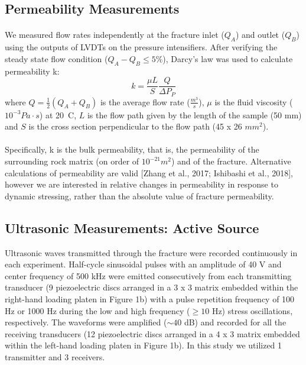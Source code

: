 \documentclass[letterpaper,10pt]{article}
\begin{document}
\subsection{Permeability Measurements}
\paragraph{} We measured flow rates independently at the fracture inlet ($Q_A$) and outlet ($Q_B$) using the outputs of LVDTs on the pressure intensifiers. After verifying the steady state flow condition ($Q_{A} - Q_{B}  \leq 5 \% $), Darcy’s law was
used to calculate permeability k:
\begin{equation} \label{eq:perm}
	k = \frac{\mu L}{S} \frac{Q}{\Delta P_P}
\end{equation}
where $Q = \frac{1}{2} (Q_A + Q_B )$ is the average flow rate ($\frac{m^3}{s}$), $\mu$ is the fluid viscosity ($10^{-3} Pa\cdot s$) at 20\textdegree\ C, $L$ is the flow path given by the length of the sample (50 mm) and $S$ is the cross section perpendicular to the flow path (45 x 26 $mm^2$).
\paragraph{} Specifically, k is the bulk permeability, that is, the permeability of the surrounding rock matrix (on order of $10^{-21} m^2$) and of the fracture. Alternative calculations of permeability are valid [Zhang et al., 2017; Ishibashi et al., 2018], however we are interested in relative changes in permeability in response to dynamic stressing, rather than the absolute value of fracture permeability.


\subsection{Ultrasonic Measurements: Active Source}
Ultrasonic waves transmitted through the fracture were recorded continuously in each experiment. Half-cycle sinusoidal pulses with an amplitude of 40 V and center frequency of 500 kHz were emitted consecutively from each transmitting transducer (9 piezoelectric discs arranged in a 3 x 3 matrix embedded within the right-hand loading platen in Figure 1b) with a pulse repetition frequency of 100 Hz or 1000 Hz during the low and high frequency ($\geq 10$ Hz) stress oscillations, respectively. The waveforms were amplified ($\sim 40$ dB) and recorded for all the receiving transducers (12 piezoelectric discs arranged in a 4 x 3 matrix embedded within the left-hand loading platen in Figure 1b). In this study we utilized 1 transmitter and 3 receivers. 
\end{document}
